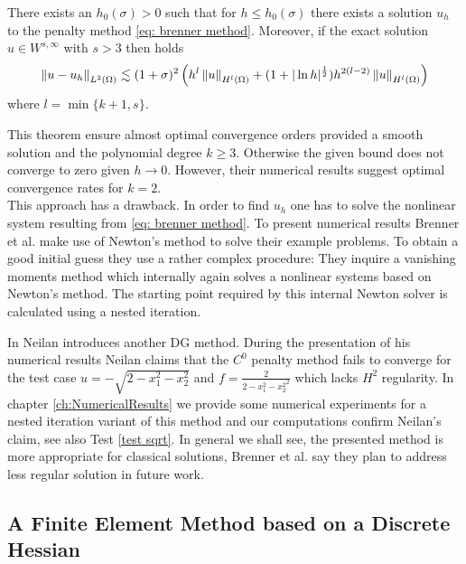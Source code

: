 \begin{theorem}\label{thm: error estimate brenner 2}
	There exists an $h_0(\sigma) > 0$ such that for $h \leq h_0(\sigma)$ there exists a solution $u_h$ to the penalty method \eqref{eq: brenner method}. Moreover, if the exact solution $u \in W^{s,\infty}$ with $s>3$ then holds
	\begin{align*}
		\left\lVert u-u_h \right\rVert_{L^2(\Omega)} \lesssim (1+\sigma)^2 
		                        \left(h^{l} \left\lVert u \right\rVert_{H^l(\Omega)} + (1+ | \ln h |^{\frac 1 2 }) h^{2(l-2)} \left\lVert u \right\rVert_{H^l(\Omega)} \right)
	\end{align*}
where $l=\min\{k+1,s\}$. 
\end{theorem}
This theorem ensure almost optimal convergence orders provided a smooth solution and the polynomial degree $k\geq 3$. Otherwise the given bound does not converge to zero given $h \rightarrow 0$. However, their numerical results suggest optimal convergence rates for $k=2$.\\
This approach has a drawback. In order to find $u_h$ one has to solve the nonlinear system resulting from \eqref{eq: brenner method}. To present numerical results Brenner et al. make use of Newton's method to solve their example problems. 
To obtain a good initial guess they use a rather complex procedure: They inquire a vanishing moments method which internally again solves a nonlinear systems based on Newton's method. The starting point required by this internal Newton solver is calculated using a nested iteration.

In \cite{Neilan2014} Neilan introduces another DG method. During the presentation of his numerical results Neilan claims that the $C^0$ penalty method fails to converge for the test case $u = -\sqrt{2 - x_1^2 - x_2^2 }$ and $f = \frac 2 {{2 - x_1^2 - x_2^2}^2}$ which lacks $H^2$ regularity. 
In chapter \ref{ch:NumericalResults} we provide some numerical experiments for a nested iteration variant of this method and our computations confirm Neilan's claim, see also Test \ref{test sqrt}. In general we shall see, the presented method is more appropriate for classical solutions, Brenner et al. say they plan to address less regular solution in future work. 


\subsection{A Finite Element Method based on a Discrete Hessian} \label{subsec: disrete Hessian} \label{sec: FEM discrete Hessian}


